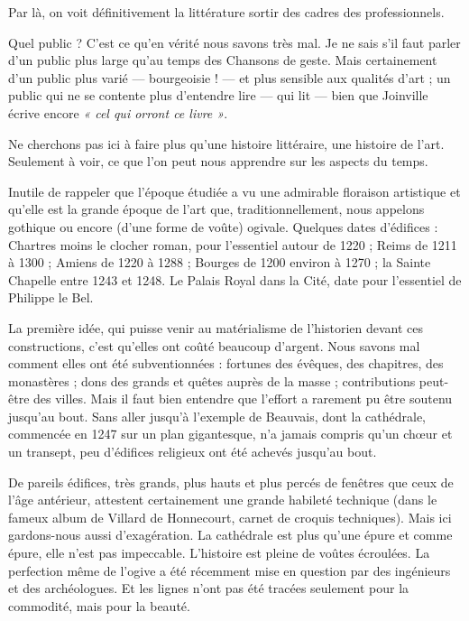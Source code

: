 \documentclass[french,twoside]{book} %
\begin{document}
Par là, on voit définitivement la littérature sortir des cadres des professionnels.\par
Quel public ? C’est ce qu’en vérité nous savons très mal. Je ne sais s’il faut parler d’un public plus large qu’au temps des Chansons de geste. Mais certainement d’un public plus varié — bourgeoisie ! — et plus sensible aux qualités d’art ; un public qui ne se contente plus d’entendre lire — qui lit — bien que Joinville écrive encore \emph{« cel qui orront ce livre »}.\par
Ne cherchons pas ici à faire plus qu’une histoire littéraire, une histoire de l’art. Seulement à voir, ce que l’on peut nous apprendre sur les aspects du temps.\par
Inutile de rappeler que l’époque étudiée a vu une admirable floraison artistique et qu’elle est la grande époque de l’art que, traditionnellement, nous appelons gothique ou encore (d’une forme de voûte) ogivale. Quelques dates d’édifices : Chartres moins le clocher roman, pour l’essentiel autour de 1220 ; Reims de 1211 à 1300 ; Amiens de 1220 à 1288 ; Bourges de 1200 environ à 1270 ; la Sainte Chapelle entre 1243 et 1248. Le Palais Royal dans la Cité, date pour l’essentiel de Philippe le Bel.\par
La première idée, qui puisse venir au matérialisme de l’historien devant ces constructions, c’est qu’elles ont coûté beaucoup d’argent. Nous savons mal comment elles ont été subventionnées : fortunes des évêques, des chapitres, des monastères ; dons des grands et quêtes auprès de la masse ; contributions peut-être des villes. Mais il faut bien entendre que l’effort a rarement pu être soutenu jusqu’au bout. Sans aller jusqu’à l’exemple de Beauvais, dont la cathédrale, commencée en 1247 sur un plan gigantesque, n’a jamais compris qu’un chœur et un transept, peu d’édifices religieux ont été achevés jusqu’au bout.\par
De pareils édifices, très grands, plus hauts et plus percés de fenêtres que ceux de l’âge antérieur, attestent certainement une grande habileté technique (dans le fameux album de Villard de Honnecourt, carnet de croquis techniques). Mais ici gardons-nous aussi d’exagération. La cathédrale est plus qu’une épure et comme  
\label{p124} épure, elle n’est pas impeccable. L’histoire est pleine de voûtes écroulées. La perfection même de l’ogive a été récemment mise en question par des ingénieurs et des archéologues. Et les lignes n’ont pas été tracées seulement pour la commodité, mais pour la beauté.\par
\end{document}
